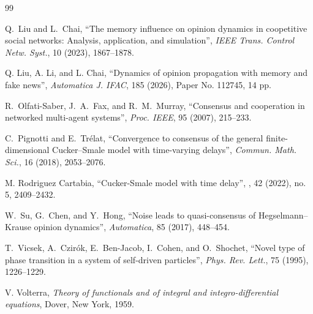 \documentclass[11pt]{amsart}
\numberwithin{equation}{section}
\begin{document}
\begin{thebibliography}{99}

Q.~Liu and L.~Chai, ``The memory influence on opinion dynamics in coopetitive social networks: Analysis, application, and simulation'', \textit{IEEE Trans. Control Netw. Syst.}, 10 (2023), 1867--1878.

Q. Liu, A. Li, and L. Chai, ``Dynamics of opinion propagation with memory and fake news'', \textit{Automatica J. IFAC}, 185 (2026), Paper No. 112745, 14 pp.


R.~Olfati-Saber, J.~A.~Fax, and R.~M.~Murray, ``Consensus and cooperation in networked multi-agent systems'', \textit{Proc. IEEE}, 95 (2007), 215--233.

C.~Pignotti and E.~Tr\'elat, ``Convergence to consensus of the general finite-dimensional Cucker--Smale model with time-varying delays'', \textit{Commun. Math. Sci.}, 16 (2018), 2053--2076.


M. Rodriguez Cartabia,
``Cucker-Smale model with time delay'',
, 42 (2022), no. 5, 2409--2432.

W.~Su, G.~Chen, and Y.~Hong, ``Noise leads to quasi-consensus of Hegselmann--Krause opinion dynamics'', \textit{Automatica}, 85 (2017), 448--454.

T.~Vicsek, A.~Czir\'ok, E.~Ben-Jacob, I.~Cohen, and O.~Shochet, ``Novel type of phase transition in a system of self-driven particles'', \textit{Phys. Rev. Lett.}, 75 (1995), 1226--1229.

V. Volterra, \emph{Theory of functionals and of integral and integro-differential equations}, Dover, New York, 1959.



\end{thebibliography}
\end{document}
